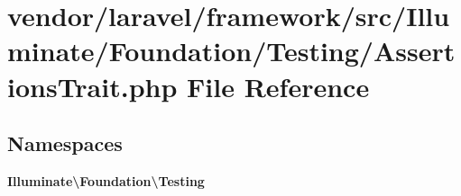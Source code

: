 \section{vendor/laravel/framework/src/\+Illuminate/\+Foundation/\+Testing/\+Assertions\+Trait.php File Reference}
\label{_assertions_trait_8php}
\subsection*{Namespaces}
\begin{DoxyCompactItemize}
\item 
 {\bf Illuminate\textbackslash{}\+Foundation\textbackslash{}\+Testing}
\end{DoxyCompactItemize}
